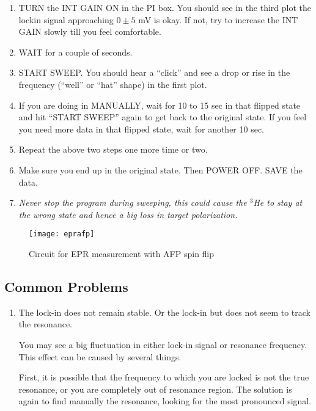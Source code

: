 {\begin{enumerate}
\item TURN the INT GAIN ON in the PI box. You should see in the third plot 
the lockin signal approaching $0 \pm 5$ mV is okay. If not, try to increase the INT GAIN slowly till you feel comfortable.

\item WAIT for a couple of seconds.
  
\item START SWEEP. You should hear a ``click'' and see a drop or rise in the frequency (``well'' or ``hat'' shape) in the first plot.

\item If you are doing in MANUALLY, wait for 10 to 15 sec in that flipped state and hit ``START SWEEP'' again to get back to the original state. If you feel you need more data in that flipped state, wait for another 10 sec.

\item Repeat the above two steps one more time or two.

\item Make sure you end up in the original state. Then POWER OFF. SAVE the data. 
\item \emph{Never stop the program during sweeping, this could cause the $^3$He
 to stay at the wrong state and hence a big loss in target polarization. }

\end{enumerate}        

\begin{figure}
\begin{center}
\centerline{ \texttt{[image: eprafp]}}
\caption{Circuit for EPR measurement with AFP spin flip}
\end{center}
\label{fig2:epr}
\end{figure}

\subsection{Common Problems}

\begin{enumerate}


\item The lock-in does not remain stable.  
Or the lock-in but does not seem to track the resonance.

You may see a big fluctuation in either lock-in signal or resonance frequency.
This effect can be caused by several things.  

First, it is possible that
the frequency to which you are locked is not the true resonance, or
you are completely out of resonance region.
The solution is again to find manually the resonance, looking for the
most pronounced signal.  


\end{enumerate}}
